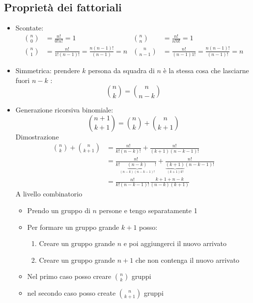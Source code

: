 \subsection{Proprietà dei fattoriali}
\begin{itemize}
	\item Scontate:
	\begin{align*}
	\binom{n}{0} &=  \frac{n!}{0!n!}= 1 &  \binom{n}{n}&=  \frac{n!}{n!0!}= 1 \\
	\binom{n}{1} &=  \frac{n!}{1!\left( n-1 \right) !}=  \frac{n \left( n-1 \right) !}{\left( n-1 \right) }=n &  \binom{n}{n-1} &= \frac{n!}{\left( n-1 \right) 1!}= \frac{n\left( n-1 \right) !}{\left( n-1 \right) !}=n
	\end{align*}
	\item Simmetrica: prendere $k$ persona da squadra di $n$ è la stessa cosa che lasciarne fuori $n-k$ :
\[
\binom{n}{k}= \binom{n}{n-k}
\] 
	\item Generazione ricorsiva binomiale:
	\[
	\binom{n+1}{k+1} = \binom{n}{k} + \binom{n}{k+1}
	\]
	Dimostrazione
		\begin{align*}
		\binom{n}{k} + \binom{n}{k+1} &=  \frac{n!}{k! \left( n-k \right) !} + \frac{n!}{\left( k+1 \right) \left( n-k-1 \right) !}\\
		&= \frac{n!}{k! \underbrace{\left( n-k \right)}_{\left( n-k \right) \left( n-k-1 \right) !} !} + \frac{n!}{\underbrace{\left( k+1 \right)}_{\left( k+1 \right) k!} \left( n-k-1 \right) !} \\
		&= \frac{n!}{k! \left( n-k-1 \right) !} \frac{k+1 +n-k}{\left( n-k \right) \left( k+1 \right) }
		\end{align*}
A livello combinatorio
\begin{itemize}
	\item Prendo un gruppo di $n$ persone e tengo separatamente 1
	\item Per formare un gruppo grande $k+1$ posso:
	\begin{enumerate}
		\item Creare un gruppo grande $n$ e poi aggiungerci il nuovo arrivato
		\item Creare un gruppo grande $n+1$ che non contenga il nuovo arrivato 
	\end{enumerate}
	\item Nel primo caso posso creare $ \binom{n}{k}$ gruppi
	\item nel secondo caso posso create $ \binom{n}{k+1}$ gruppi
\end{itemize}
\end{itemize}

